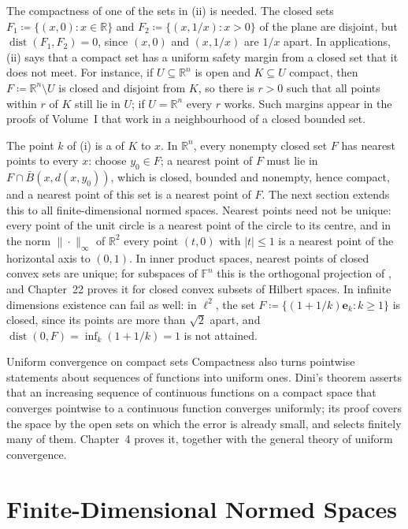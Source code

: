 The compactness of one of the sets in (ii) is needed. The closed sets $F_1\coloneqq\{(x,0): x\in\mathbb R\}$ and $F_2\coloneqq\{(x,1/x): x>0\}$ of the plane are disjoint, but $\operatorname{dist}(F_1,F_2)=0$, since $(x,0)$ and $(x,1/x)$ are $1/x$ apart. In applications, (ii) says that a compact set has a uniform safety margin from a closed set that it does not meet. For instance, if $U\subseteq\mathbb R^n$ is open and $K\subseteq U$ compact, then $F\coloneqq\mathbb R^n\setminus U$ is closed and disjoint from $K$, so there is $r>0$ such that all points within $r$ of $K$ still lie in $U$; if $U=\mathbb R^n$ every $r$ works. Such margins appear in the proofs of Volume~I that work in a neighbourhood of a closed bounded set.

The point $k$ of (i) is a  of $K$ to $x$. In $\mathbb R^n$, every nonempty closed set $F$ has nearest points to every $x$: choose $y_0\in F$; a nearest point of $F$ must lie in $F\cap\bar B(x,d(x,y_0))$, which is closed, bounded and nonempty, hence compact, and a nearest point of this set is a nearest point of $F$. The next section extends this to all finite-dimensional normed spaces. Nearest points need not be unique: every point of the unit circle is a nearest point of the circle to its centre, and in the norm $\|\cdot\|_\infty$ of $\mathbb R^2$ every point $(t,0)$ with $|t|\le1$ is a nearest point of the horizontal axis to $(0,1)$. In inner product spaces, nearest points of closed convex sets are unique; for subspaces of $\mathbb F^n$ this is the orthogonal projection of , and Chapter~22 proves it for closed convex subsets of Hilbert spaces. In infinite dimensions existence can fail as well: in $\ell^2$, the set $F\coloneqq\{(1+1/k)\mathbf e_k: k\ge1\}$ is closed, since its points are more than $\sqrt2$ apart, and $\operatorname{dist}(0,F)=\inf_k(1+1/k)=1$ is not attained.

\begin{note}{Uniform convergence on compact sets}
Compactness also turns pointwise statements about sequences of functions into uniform ones. Dini's theorem asserts that an increasing sequence of continuous functions on a compact space that converges pointwise to a continuous function converges uniformly; its proof covers the space by the open sets on which the error is already small, and selects finitely many of them. Chapter~4 proves it, together with the general theory of uniform convergence.
\end{note}

\section{Finite-Dimensional Normed Spaces}
\label{sec:finite-dimensional}

